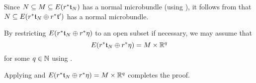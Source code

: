\begin{scope}
\begin{myproof}
\begin{steps}
            Since $N \subseteq{} M \subseteq{} E(r^*\mathfrak{t}_N)$ has a normal microbundle (using ),
            it follows from  that
            $N \subseteq{} E(r^*\mathfrak{t}_N \oplus{} r^*\mathfrak{t}')$ has a normal microbundle.
    
            By restricting $E(r^*\mathfrak{t}_N \oplus{} r^*\eta)$ to an open subset if necessary, we may assume that
             \[ E(r^*\mathfrak{t}_N \oplus{} r^*\eta) = M \times \mathbb{R}^q \]
            for some $q \in \mathbb{N}$ using .
        \end{steps}
        Applying  and $E(r^*\mathfrak{t}_N \oplus{} r^*\eta) = M \times \mathbb{R}^q$ completes the proof.
    \end{myproof}

    \begin{myparagraph}
        
    \end{myparagraph}
\end{scope}